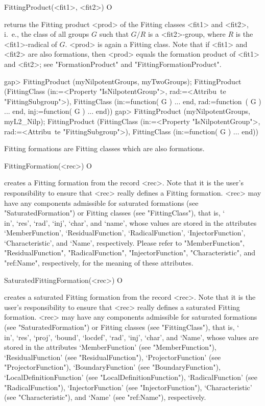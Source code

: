 \>FittingProduct(<fit1>, <fit2>) O

returns the Fitting product <prod> of the Fitting classes <fit1> and <fit2>,
i.~e., the class of all groups $G$ such that $G/R$ is  a <fit2>-group, where
$R$ is the <fit1>-radical of $G$.  <prod> is again a Fitting class.
Note that if <fit1> and <fit2> are also
formations, then <prod> equals the
formation product of <fit1> and <fit2>; see "FormationProduct" 
and
"FittingFormationProduct".

\beginexample
gap> FittingProduct (myNilpotentGroups, myTwoGroups);
FittingProduct (FittingClass (in:=<Property "IsNilpotentGroup">, rad:=<Attribu\
te "FittingSubgroup">), FittingClass (in:=function( G ) ... end, rad:=function\
( G ) ... end, inj:=function( G ) ... end))
gap> FittingProduct (myNilpotentGroups, myL2_Nilp);
FittingProduct (FittingClass (in:=<Property "IsNilpotentGroup">, rad:=<Attribu\
te "FittingSubgroup">), FittingClass (in:=function( G ) ... end))
\endexample


\null

\index{Fitting formations!creating}

Fitting formations are Fitting classes which are also formations.

\>FittingFormation(<rec>) O

creates a Fitting formation from the record <rec>. Note that it is the user's 
responsibility to ensure that <rec> really defines a Fitting formation.
<rec> may  have any components admissible for saturated formations (see
"SaturatedFormation")  or Fitting classes (see "FittingClass"), that is,
`\\in', `res', `rad', `inj', `char', and `name', 
 whose values are stored in the attributes `MemberFunction',
`ResidualFunction', `RadicalFunction',
`InjectorFunction', `Characteristic', and `Name', respectively.
Please refer
to "MemberFunction",  "ResidualFunction", "RadicalFunction",
"InjectorFunction",  "Characteristic", and "ref:Name", respectively, for the
meaning of these attributes.


\>SaturatedFittingFormation(<rec>) O

creates a saturated Fitting formation from the record <rec>. Note that it is the user's responsibility to ensure that <rec> really
defines a saturated Fitting formation. <rec> may have any
components admissible for saturated formations (see "SaturatedFormation") or
Fitting classes (see "FittingClass"), that is, `\\in', `res', `proj',
`bound', `locdef', `rad', `inj',   `char', and `Name', whose values are
stored in the attributes `MemberFunction' (see "MemberFunction"),
`ResidualFunction' (see "ResidualFunction"),
 `ProjectorFunction' (see "ProjectorFunction"), `BoundaryFunction' (see
"BoundaryFunction"), `LocalDefinitionFunction' (see
"LocalDefinitionFunction"), `RadicalFunction' (see "RadicalFunction"),
`InjectorFunction' (see "InjectorFunction"), `Characteristic' (see
"Characteristic"), and `Name' (see "ref:Name"), respectively.



